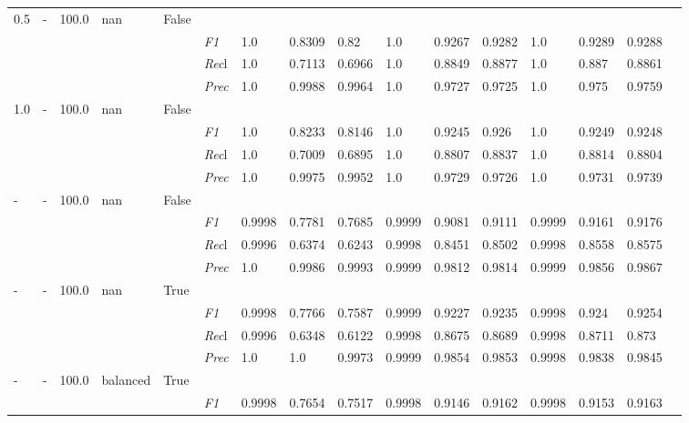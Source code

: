 \begin{table}[]
\begin{tabularx}{\textwidth}{XXXXX|X|XXX|XXX|XXXX}
    0.5 & - & 100.0 & nan & False& & & & & & & & & \\
    & & & & & \textit{F1} & 1.0 & 0.8309 & 0.82 & 1.0 & 0.9267        & 0.9282        & 1.0        & 0.9289        & 0.9288        \\
    & & & & & \textit{Rec}l & 1.0 & 0.7113 & 0.6966    & 1.0 & 0.8849    & 0.8877    & 1.0    & 0.887    & 0.8861    \\
    & & & & & \textit{Prec} & 1.0 & 0.9988 & 0.9964 & 1.0 & 0.9727 & 0.9725 & 1.0 & 0.975 & 0.9759 \\ \midrule
    1.0 & - & 100.0 & nan & False& & & & & & & & & \\
    & & & & & \textit{F1} & 1.0 & 0.8233 & 0.8146 & 1.0 & 0.9245        & 0.926        & 1.0        & 0.9249        & 0.9248        \\
    & & & & & \textit{Rec}l & 1.0 & 0.7009 & 0.6895    & 1.0 & 0.8807    & 0.8837    & 1.0    & 0.8814    & 0.8804    \\
    & & & & & \textit{Prec} & 1.0 & 0.9975 & 0.9952 & 1.0 & 0.9729 & 0.9726 & 1.0 & 0.9731 & 0.9739 \\ \midrule
    - & - & 100.0 & nan & False& & & & & & & & & \\
    & & & & & \textit{F1} & 0.9998 & 0.7781 & 0.7685 & 0.9999 & 0.9081        & 0.9111        & 0.9999        & 0.9161        & 0.9176        \\
    & & & & & \textit{Rec}l & 0.9996 & 0.6374 & 0.6243    & 0.9998 & 0.8451    & 0.8502    & 0.9998    & 0.8558    & 0.8575    \\
    & & & & & \textit{Prec} & 1.0 & 0.9986 & 0.9993 & 0.9999 & 0.9812 & 0.9814 & 0.9999 & 0.9856 & 0.9867 \\ \midrule
    - & - & 100.0 & nan & True& & & & & & & & & \\
    & & & & & \textit{F1} & 0.9998 & 0.7766 & 0.7587 & 0.9999 & 0.9227        & 0.9235        & 0.9998        & 0.924        & 0.9254        \\
    & & & & & \textit{Rec}l & 0.9996 & 0.6348 & 0.6122    & 0.9998 & 0.8675    & 0.8689    & 0.9998    & 0.8711    & 0.873    \\
    & & & & & \textit{Prec} & 1.0 & 1.0 & 0.9973 & 0.9999 & 0.9854 & 0.9853 & 0.9998 & 0.9838 & 0.9845 \\ \midrule
    - & - & 100.0 & balanced & True& & & & & & & & & \\
    & & & & & \textit{F1} & 0.9998 & 0.7654 & 0.7517 & 0.9998 & 0.9146        & 0.9162        & 0.9998        & 0.9153        & 0.9163        \\

\end{tabularx}
\end{table}
